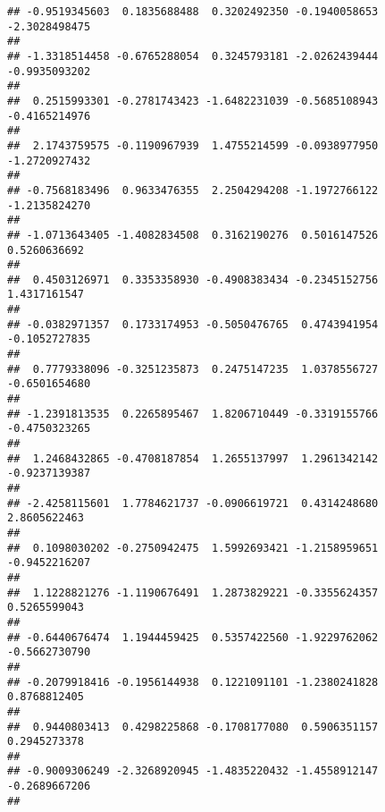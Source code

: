 \documentclass[]{article}
\begin{document}
\begin{verbatim}
## -0.9519345603  0.1835688488  0.3202492350 -0.1940058653 -2.3028498475 
##                                                                       
## -1.3318514458 -0.6765288054  0.3245793181 -2.0262439444 -0.9935093202 
##                                                                       
##  0.2515993301 -0.2781743423 -1.6482231039 -0.5685108943 -0.4165214976 
##                                                                       
##  2.1743759575 -0.1190967939  1.4755214599 -0.0938977950 -1.2720927432 
##                                                                       
## -0.7568183496  0.9633476355  2.2504294208 -1.1972766122 -1.2135824270 
##                                                                       
## -1.0713643405 -1.4082834508  0.3162190276  0.5016147526  0.5260636692 
##                                                                       
##  0.4503126971  0.3353358930 -0.4908383434 -0.2345152756  1.4317161547 
##                                                                       
## -0.0382971357  0.1733174953 -0.5050476765  0.4743941954 -0.1052727835 
##                                                                       
##  0.7779338096 -0.3251235873  0.2475147235  1.0378556727 -0.6501654680 
##                                                                       
## -1.2391813535  0.2265895467  1.8206710449 -0.3319155766 -0.4750323265 
##                                                                       
##  1.2468432865 -0.4708187854  1.2655137997  1.2961342142 -0.9237139387 
##                                                                       
## -2.4258115601  1.7784621737 -0.0906619721  0.4314248680  2.8605622463 
##                                                                       
##  0.1098030202 -0.2750942475  1.5992693421 -1.2158959651 -0.9452216207 
##                                                                       
##  1.1228821276 -1.1190676491  1.2873829221 -0.3355624357  0.5265599043 
##                                                                       
## -0.6440676474  1.1944459425  0.5357422560 -1.9229762062 -0.5662730790 
##                                                                       
## -0.2079918416 -0.1956144938  0.1221091101 -1.2380241828  0.8768812405 
##                                                                       
##  0.9440803413  0.4298225868 -0.1708177080  0.5906351157  0.2945273378 
##                                                                       
## -0.9009306249 -2.3268920945 -1.4835220432 -1.4558912147 -0.2689667206 
##                                                                       

\end{verbatim}
\end{document}
